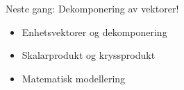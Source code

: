 \documentclass[aspectratio=169, 12pt]{beamer}
\begin{document}
\begin{frame}
\begin{center}
  \Huge{Neste gang: Dekomponering av vektorer!}
  \begin{itemize}
    \item Enhetsvektorer og dekomponering
    \item Skalarprodukt og kryssprodukt
    \item Matematisk modellering
  \end{itemize}
\end{center}
\end{frame}
\end{document}

